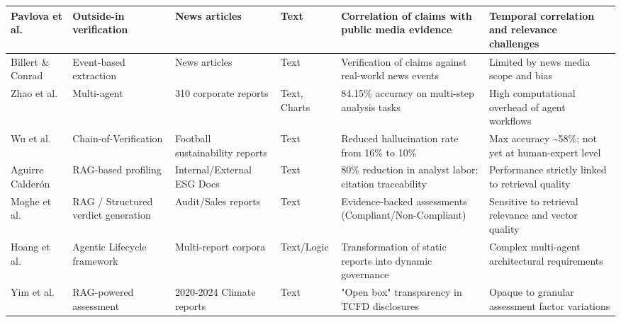 \begin{landscape}
\begin{table}[p]
\begin{tabularx}{\linewidth}{|p{1.8cm}|X|X|p{1.8cm}|X|X|}
Pavlova et al.  \parencite{mariya_pavlova_259be499} & Outside-in verification & News articles & Text & Correlation of claims with public media evidence & Temporal correlation and relevance challenges \\ \hline
Billert \& Conrad  \parencite{fabian_billert_a5fbb687} & Event-based extraction & News articles & Text & Verification of claims against real-world news events & Limited by news media scope and bias \\ \hline
Zhao et al.  \parencite{yilei_zhao_b7bbd9c8} & Multi-agent & 310 corporate reports & Text, Charts & 84.15\% accuracy on multi-step analysis tasks & High computational overhead of agent workflows \\ \hline
Wu et al.  \parencite{yue_wu_cae353aa} & Chain-of-Verification & Football sustainability reports & Text & Reduced hallucination rate from 16\% to 10\% & Max accuracy \textasciitilde{}58\%; not yet at human-expert level \\ \hline
Aguirre Calderón  \parencite{juan_aguirre_calder_n_5eae82e0} & RAG-based profiling & Internal/External ESG Docs & Text & 80\% reduction in analyst labor; citation traceability & Performance strictly linked to retrieval quality \\ \hline
Moghe et al.  \parencite{abhijeet_b__moghe_963e6c96} & RAG / Structured verdict generation & Audit/Sales reports & Text & Evidence-backed assessments (Compliant/Non-Compliant) & Sensitive to retrieval relevance and vector quality \\ \hline
Hoang et al.  \parencite{thong_hoang_d30a390b} & Agentic Lifecycle framework & Multi-report corpora & Text/Logic & Transformation of static reports into dynamic governance & Complex multi-agent architectural requirements \\ \hline
Yim et al.  \parencite{tik_yu_yim_951fa18a} & RAG-powered assessment & 2020-2024 Climate reports & Text & "Open box" transparency in TCFD disclosures & Opaque to granular assessment factor variations \\ \hline
\end{tabularx}
\end{table}
\end{landscape}

